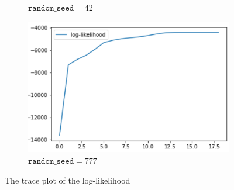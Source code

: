 \documentclass[11pt]{article}
\begin{document}
\begin{figure}[H]
\begin{subfigure}[H]{0.5\textwidth}
        \caption{$\texttt{random\_seed}=42$}
    \end{subfigure}
    \begin{subfigure}[H]{0.5\textwidth}
        \includegraphics[width=1\linewidth]{img/plot_777.PNG}
        \caption{$\texttt{random\_seed}=777$}
    \end{subfigure}
    \caption{The trace plot of the log-likelihood}
    \label{fig2}
\end{figure}
\end{document}
